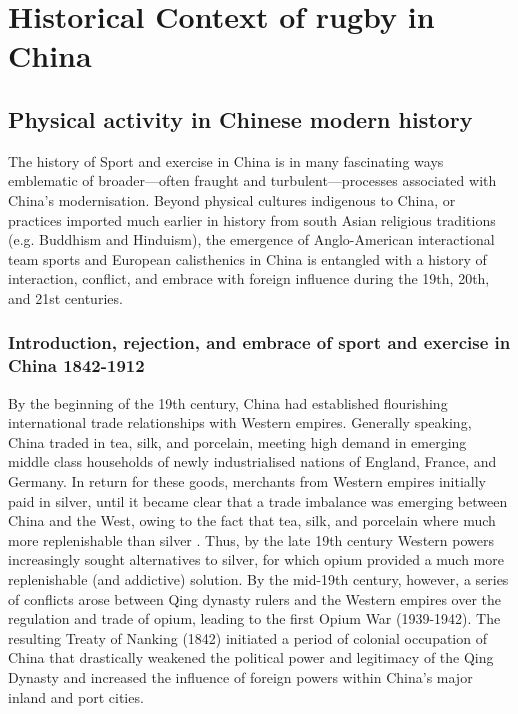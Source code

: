 \section{Historical Context of rugby in China}

\subsection{Physical activity in Chinese modern history}
The history of Sport and exercise in China is in many fascinating ways emblematic of broader---often fraught and turbulent---processes associated with China's modernisation.  Beyond physical cultures indigenous to China, or practices imported much earlier in history from south Asian religious traditions (e.g. Buddhism and Hinduism), the emergence of Anglo-American interactional team sports and European calisthenics in China is entangled with a history of interaction, conflict, and embrace with foreign influence during the 19th, 20th, and 21st centuries.

  \subsubsection{Introduction, rejection, and embrace of sport and exercise in China 1842-1912}
By the beginning of the 19th century, China had established flourishing international trade relationships with Western empires.  Generally speaking, China traded in tea, silk, and porcelain, meeting high demand in emerging middle class households of newly industrialised nations of England, France, and Germany.  In return for these goods,   merchants from Western empires initially paid in silver, until it became clear that a trade imbalance was emerging between China and the West, owing to the fact that tea, silk, and porcelain where much more replenishable than silver \citep{Fay2005}.  Thus, by the late 19th century Western powers increasingly sought alternatives to silver, for which opium provided a much more replenishable (and addictive) solution.  By the mid-19th century, however, a series of conflicts arose between Qing dynasty rulers and the Western empires over the regulation and trade of opium, leading to the first Opium War (1939-1942).  The resulting Treaty of Nanking (1842) initiated a period of colonial occupation of China that drastically weakened the political power and legitimacy of the Qing Dynasty and increased the influence of foreign powers within China's major inland and port cities.

